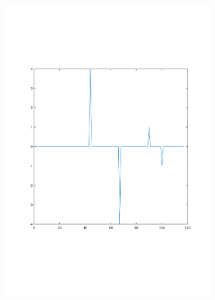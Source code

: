 \documentclass[sigconf]{acmart}
\begin{document}
\begin{figure}[!htp]
	\centering
	\begin{subfigure}[t]{0.4\linewidth}
		\centering
		\includegraphics[width=0.95\linewidth, trim={100 100 0 0}, clip=true]{fig/route_change_8}
		\label{fig:3.2a}
	\end{subfigure}
	\begin{subfigure}[t]{0.4\linewidth}
		\centering

\end{subfigure}
\end{figure}
\end{document}
